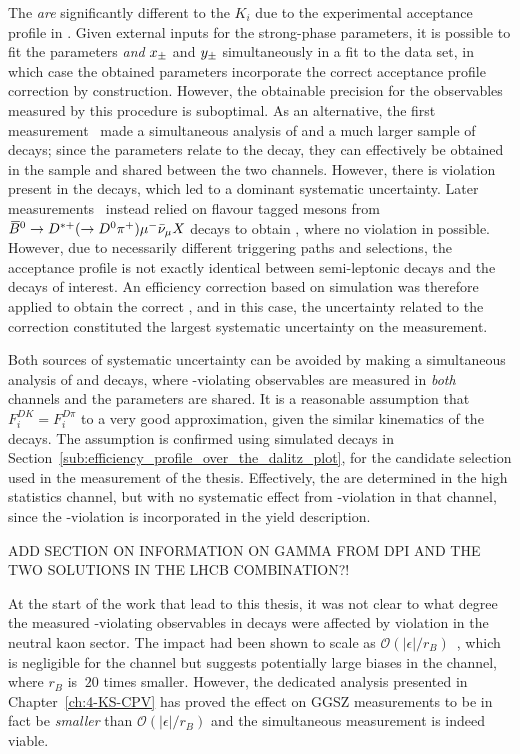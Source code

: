 The \Fi \emph{are} significantly different to the $K_i$ due to the experimental acceptance profile in \lhcb. Given external inputs for the strong-phase parameters, it is possible to fit the \Fi parameters \emph{and} $x_\pm$ and $y_\pm$ simultaneously in a fit to the \lhcb \BtoDK data set, in which case the obtained \Fi parameters incorporate the correct acceptance profile correction by construction. However, the obtainable precision for the \CP observables measured by this procedure is suboptimal. As an alternative, the first \lhcb measurement~\cite{LHCb-PAPER-2012-027} made a simultaneous analysis of \BtoDK and a much larger sample of \BtoDpi decays; since the \Fi parameters relate to the \D decay, they can effectively be obtained in the \Dpi sample  and shared between the two \BtoDh channels. However, there is \CP violation present in the \BtoDpi decays, which led to a dominant systematic uncertainty. Later \lhcb measurements~\cite{LHCb-PAPER-2014-041,LHCb-PAPER-2018-017} instead relied on flavour tagged \D mesons from ${{\kern 0.18em\overline{\kern -0.18em B}}{}^0}\rightarrow{\ensuremath{{D}^{*+}}}(\rightarrow {\ensuremath{{D}^0}} {\ensuremath{{\pi}^+}})\mu^- \bar \nu_\mu X$ decays to obtain \Fi, where no \CP violation in possible. However, due to necessarily different triggering paths and selections, the acceptance profile is not exactly identical between semi-leptonic decays and the \BtoDh decays of interest. An efficiency correction based on simulation was therefore applied to obtain the correct \Fi, and in this case,  the uncertainty related to the correction constituted the largest systematic uncertainty on the measurement.

Both sources of systematic uncertainty can be avoided by making a simultaneous analysis of \BtoDK and \BtoDpi decays, where \CP-violating observables are measured in \emph{both} channels and the \Fi parameters are shared. It is a reasonable assumption that $F_i^{DK}=F_i^{D\pi}$ to a very good approximation, given the similar kinematics of the decays. The assumption is confirmed using simulated decays in Section~\ref{sub:efficiency_profile_over_the_dalitz_plot}, for the candidate selection used in the measurement of the thesis. Effectively, the \Fi are determined in the high statistics \BtoDpi channel, but with no systematic effect from \CP-violation in that channel, since the \CP-violation is incorporated in the yield description. 

ADD SECTION ON INFORMATION ON GAMMA FROM DPI AND THE TWO SOLUTIONS IN THE LHCB COMBINATION?!

At the start of the work that lead to this thesis, it was not clear to what degree the measured \CP-violating observables in \BtoDpi decays were affected by \CP violation in the neutral kaon sector. The impact had been shown to scale as $\mathcal O(|\epsilon| / r_B)$~\cite{grossmanEffectsBarMixing2014}, which is negligible for the \BtoDK channel but suggests potentially large biases in the \BtoDpi channel, where $r_B$ is $~20$ times smaller. However, the dedicated analysis presented in Chapter~\ref{ch:4-KS-CPV} has proved the effect on GGSZ measurements to be in fact be \emph{smaller} than $\mathcal O(|\epsilon| / r_B)$ and the simultaneous measurement is indeed viable. 

